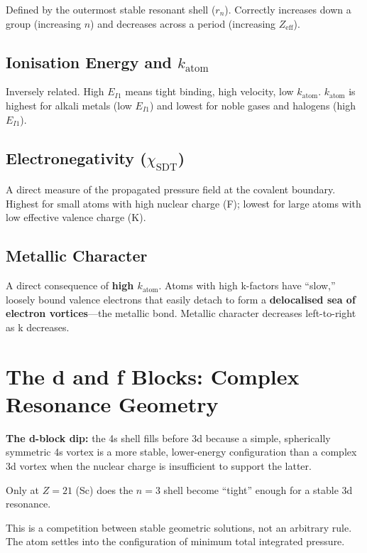 Defined by the outermost stable resonant shell ($r_n$).  Correctly increases down a group (increasing $n$) and decreases across a period (increasing $Z_{\text{eff}}$).

\subsection{Ionisation Energy and $k_{\text{atom}}$}

Inversely related.  High $E_{I1}$ means tight binding, high velocity, low $k_{\text{atom}}$.  $k_{\text{atom}}$ is highest for alkali metals (low $E_{I1}$) and lowest for noble gases and halogens (high $E_{I1}$).

\subsection{Electronegativity ($\chi_{\text{SDT}}$)}

A direct measure of the propagated pressure field at the covalent boundary.  Highest for small atoms with high nuclear charge (F); lowest for large atoms with low effective valence charge (K).

\subsection{Metallic Character}

A direct consequence of \textbf{high $k_{\text{atom}}$}.  Atoms with high k-factors have ``slow,'' loosely bound valence electrons that easily detach to form a \textbf{delocalised sea of electron vortices}---the metallic bond.  Metallic character decreases left-to-right as k decreases.


\section{The d and f Blocks: Complex Resonance Geometry}

\textbf{The d-block dip:} the 4s shell fills before 3d because a simple, spherically symmetric 4s vortex is a more stable, lower-energy configuration than a complex 3d vortex when the nuclear charge is insufficient to support the latter.

Only at $Z = 21$ (Sc) does the $n = 3$ shell become ``tight'' enough for a stable 3d resonance.

This is a competition between stable geometric solutions, not an arbitrary rule.  The atom settles into the configuration of minimum total integrated pressure.


